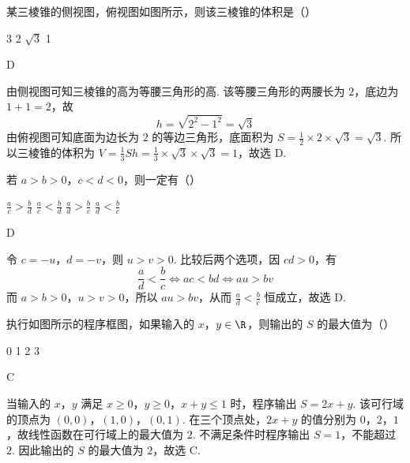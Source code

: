 \begin{problem}
某三棱锥的侧视图，俯视图如图所示，则该三棱锥的体积是（\quad）


\choices
    {3}
    {2}
    {\(\sqrt{3}\)}
    {1}
\begin{answer}
D
\end{answer}

\begin{solution}
由侧视图可知三棱锥的高为等腰三角形的高. 该等腰三角形的两腰长为 \(2\)，底边为 \(1+1=2\)，故
\[
h=\sqrt{2^{2}-1^{2}}=\sqrt{3}
\]
由俯视图可知底面为边长为 \(2\) 的等边三角形，底面积为 \(S=\frac12\times2\times\sqrt3=\sqrt3\). 所以三棱锥的体积为 \(V=\frac13Sh=\frac13\times\sqrt3\times\sqrt3=1\)，故选 D.
\end{solution}
\end{problem}

\begin{problem}
若 \(a > b > 0\)，\(c < d < 0\)，则一定有（\quad）

\choices
    {\(\frac{a}{c} > \frac{b}{d}\)}
    {\(\frac{a}{c} < \frac{b}{d}\)}
    {\(\frac{a}{d} > \frac{b}{c}\)}
    {\(\frac{a}{d} < \frac{b}{c}\)}
\begin{answer}
D
\end{answer}

\begin{solution}
令 \(c=-u\)，\(d=-v\)，则 \(u>v>0\). 比较后两个选项，因 \(cd>0\)，有
\[
\frac{a}{d}<\frac{b}{c}\iff ac<bd\iff au>bv
\]
而 \(a>b>0\)，\(u>v>0\)，所以 \(au>bv\)，从而 \(\frac{a}{d}<\frac{b}{c}\) 恒成立，故选 D.
\end{solution}
\end{problem}

\begin{problem}
执行如图所示的程序框图，如果输入的 \(x\)，\(y \in \R\)，则输出的 \(S\) 的最大值为（\quad）


\choices
    {0}
    {1}
    {2}
    {3}
\begin{answer}
C
\end{answer}

\begin{solution}
当输入的 \(x\)，\(y\) 满足 \(x\geqslant0\)，\(y\geqslant0\)，\(x+y\leqslant1\) 时，程序输出 \(S=2x+y\). 该可行域的顶点为 \((0,0)\)，\((1,0)\)，\((0,1)\). 在三个顶点处，\(2x+y\) 的值分别为 \(0\)，\(2\)，\(1\)，故线性函数在可行域上的最大值为 \(2\). 不满足条件时程序输出 \(S=1\)，不能超过 \(2\). 因此输出的 \(S\) 的最大值为 \(2\)，故选 C.
\end{solution}
\end{problem}


